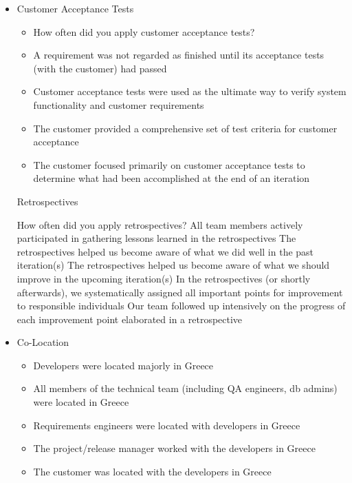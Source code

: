 \begin{itemize}
\begin{itemize}
		\end{itemize}
	\item Customer Acceptance Tests
		\begin{itemize}
			\item How often did you apply customer acceptance tests?
			\item A requirement was not regarded as finished until its acceptance tests (with the customer) had passed
			\item Customer acceptance tests were used as the ultimate way to verify system functionality and customer requirements
			\item The customer provided a comprehensive set of test criteria for customer acceptance
			\item The customer focused primarily on customer acceptance tests to determine what had been accomplished at the end of an iteration
		\end{itemize}
	\removed Retrospectives
		\begin{itemize}
			\removed How often did you apply retrospectives?
			\removed All team members actively participated in gathering lessons learned in the retrospectives
			\removed The retrospectives helped us become aware of what we did well in the past iteration(s)
			\removed The retrospectives helped us become aware of what we should improve in the upcoming iteration(s)
			\removed In the retrospectives (or shortly afterwards), we systematically assigned all important points for improvement to responsible individuals
			\removed Our team followed up intensively on the progress of each improvement point elaborated in a retrospective
		\end{itemize}
	\item Co-Location
		\begin{itemize}
			\item Developers were located majorly in Greece
			\item All members of the technical team (including QA engineers, db admins) were located in Greece
			\item Requirements engineers were located with developers in Greece
			\item The project/release manager worked with the developers in Greece
			\item The customer was located with the developers in Greece
		\end{itemize}	
\end{itemize}
